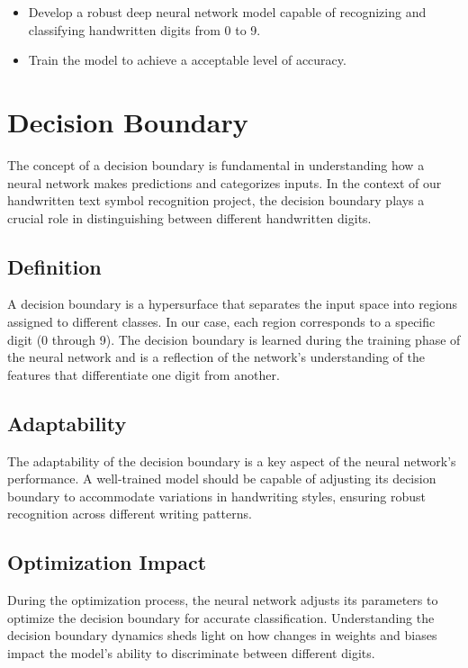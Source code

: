 \documentclass{article}
\begin{document}
\begin{itemize}
    \item Develop a robust deep neural network model capable of recognizing and classifying handwritten digits from 0 to 9.
    \item Train the model to achieve a acceptable level of accuracy.
\end{itemize}

\newpage
\section{Decision Boundary}

The concept of a decision boundary is fundamental in understanding how a neural network makes predictions and categorizes inputs. In the context of our handwritten text symbol recognition project, the decision boundary plays a crucial role in distinguishing between different handwritten digits.

\subsection{Definition}
A decision boundary is a hypersurface that separates the input space into regions assigned to different classes. In our case, each region corresponds to a specific digit (0 through 9). The decision boundary is learned during the training phase of the neural network and is a reflection of the network's understanding of the features that differentiate one digit from another.

\subsection{Adaptability}
The adaptability of the decision boundary is a key aspect of the neural network's performance. A well-trained model should be capable of adjusting its decision boundary to accommodate variations in handwriting styles, ensuring robust recognition across different writing patterns.

\subsection{Optimization Impact}
During the optimization process, the neural network adjusts its parameters to optimize the decision boundary for accurate classification. Understanding the decision boundary dynamics sheds light on how changes in weights and biases impact the model's ability to discriminate between different digits.
\end{document}

